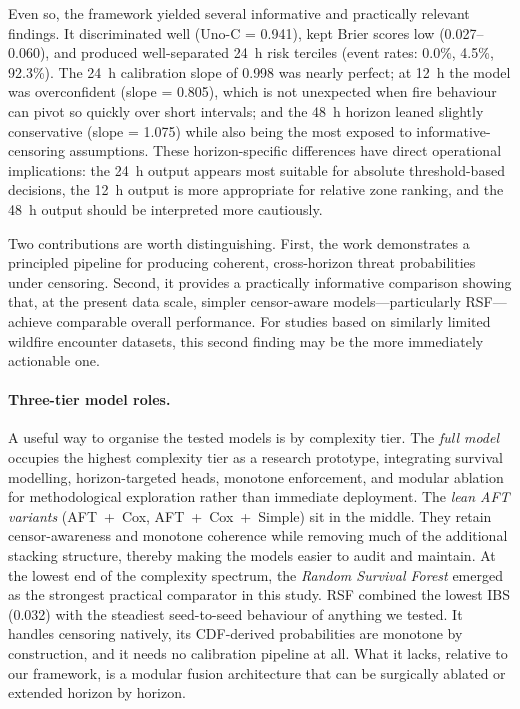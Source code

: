 \documentclass[fire,article,submit,pdftex]{../Definitions/mdpi}
\begin{document}
Even so, the framework yielded several informative and practically relevant findings. It discriminated well (Uno-C = 0.941), kept Brier scores low (0.027--0.060), and produced well-separated 24~h risk terciles (event rates: 0.0\%, 4.5\%, 92.3\%). The 24~h calibration slope of 0.998 was nearly perfect; at 12~h the model was overconfident (slope = 0.805), which is not unexpected when fire behaviour can pivot so quickly over short intervals; and the 48~h horizon leaned slightly conservative (slope = 1.075) while also being the most exposed to informative-censoring assumptions. These horizon-specific differences have direct operational implications: the 24~h output appears most suitable for absolute threshold-based decisions, the 12~h output is more appropriate for relative zone ranking, and the 48~h output should be interpreted more cautiously.

Two contributions are worth distinguishing. First, the work demonstrates a principled pipeline for producing coherent, cross-horizon threat probabilities under censoring. Second, it provides a practically informative comparison showing that, at the present data scale, simpler censor-aware models---particularly RSF---achieve comparable overall performance. For studies based on similarly limited wildfire encounter datasets, this second finding may be the more immediately actionable one.

\paragraph{Three-tier model roles.}
A useful way to organise the tested models is by complexity tier.
The \emph{full model} occupies the highest complexity tier as a research prototype, integrating survival modelling, horizon-targeted heads, monotone enforcement, and modular ablation for methodological exploration rather than immediate deployment.
The \emph{lean AFT variants} (AFT~+~Cox, AFT~+~Cox~+~Simple) sit in the middle. They retain censor-awareness and monotone coherence while removing much of the additional stacking structure, thereby making the models easier to audit and maintain.
At the lowest end of the complexity spectrum, the \emph{Random Survival Forest} emerged as the strongest practical comparator in this study. RSF combined the lowest IBS (0.032) with the steadiest seed-to-seed behaviour of anything we tested. It handles censoring natively, its CDF-derived probabilities are monotone by construction, and it needs no calibration pipeline at all. What it lacks, relative to our framework, is a modular fusion architecture that can be surgically ablated or extended horizon by horizon.
\end{document}
